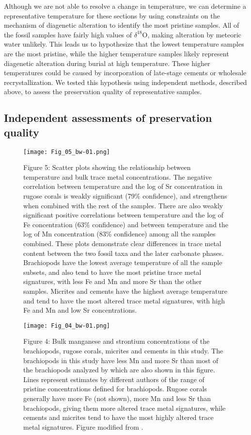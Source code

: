 \documentclass[5p, authoryear]{elsarticle}
\begin{document}
Although we are not able to resolve a change in temperature, we can determine a representative temperature for these sections by using constraints on the mechanism of diagenetic alteration to identify the most pristine samples. All of the fossil samples have fairly high values of $\delta^{18}$O, making alteration by meteoric water unlikely. This leads us to hypothesize that the lowest temperature samples are the most pristine, while the higher temperature samples likely represent diagenetic alteration during burial at high temperature. These higher temperatures could be caused by incorporation of late-stage cements or wholesale recrystallization. We tested this hypothesis using independent methods, described above, to assess the preservation quality of representative samples. 

\subsection{Independent assessments of preservation quality}

\begin{figure*}[b]
\centering
\texttt{[image: Fig\_05\_bw-01.png]}
\captionsetup{labelformat=empty} 
\caption{Figure 5: Scatter plots showing the relationship between temperature and bulk trace metal concentrations. The negative correlation between temperature and the log of Sr concentration in rugose corals is weakly significant (79\% confidence), and strengthens when combined with the rest of the samples. There are also weakly significant positive correlations between temperature and the log of Fe concentration (63\% confidence) and between temperature and the log of Mn concentration (83\% confidence) among all the samples combined. These plots demonstrate clear differences in trace metal content between the two fossil taxa and the later carbonate phases. Brachiopods have the lowest average temperature of all the sample subsets, and also tend to have the most pristine trace metal signatures, with less Fe and Mn and more Sr than the other samples. Micrites and cements have the highest average temperature and tend to have the most altered trace metal signatures, with high Fe and Mn and low Sr concentrations.}
\label{Brand}
\end{figure*}

\begin{figure}[t]
\centering
\texttt{[image: Fig\_04\_bw-01.png]}
\captionsetup{labelformat=empty} 
\caption{Figure 4: Bulk manganese and strontium concentrations of the brachiopods, rugose corals, micrites and cements in this study. The brachiopods in this study have less Mn and more Sr than most of the brachiopods analyzed by \cite{Brand2012} which are also shown in this figure. Lines represent estimates by different authors of the range of pristine concentrations defined for brachiopods. Rugose corals generally have more Fe (not shown), more Mn and less Sr than brachiopods, giving them more altered trace metal signatures, while cements and micrites tend to have the most highly altered trace metal signatures. Figure modified from \cite{Brand2012}.}
\label{metals}
\end{figure}
\end{document}
